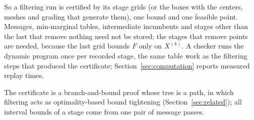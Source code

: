 So a filtering run is certified by its stage grids (or the boxes with the
centers, meshes and grading that generate them), one bound and one feasible
point. Messages, min-marginal tables, intermediate incumbents and stages
other than the last that remove nothing need not be stored; the stages that
remove points are needed, because the last grid bounds $F$ only on
$X^{(k)}$. A checker runs the dynamic program once per recorded stage, the
same table work as the filtering steps that produced the certificate;
Section~\ref{sec:computation} reports measured replay times.

The certificate is a branch-and-bound proof whose tree is a path, in which
filtering acts as optimality-based bound tightening
(Section~\ref{sec:related}); all interval bounds of a stage come from one
pair of message passes.
